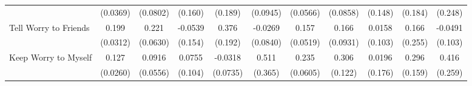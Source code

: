 {\begin{tabular}{l*{10}{c}}
            &    (0.0369)         &    (0.0802)         &     (0.160)         &     (0.189)         &    (0.0945)         &    (0.0566)         &    (0.0858)         &     (0.148)         &     (0.184)         &     (0.248)         \\
\addlinespace
Tell Worry to Friends&       0.199\sym{***}&       0.221\sym{***}&     -0.0539         &       0.376         &     -0.0269         &       0.157\sym{**} &       0.166         &      0.0158         &       0.166         &     -0.0491         \\
            &    (0.0312)         &    (0.0630)         &     (0.154)         &     (0.192)         &    (0.0840)         &    (0.0519)         &    (0.0931)         &     (0.103)         &     (0.255)         &     (0.103)         \\
\addlinespace
Keep Worry to Myself&       0.127\sym{***}&      0.0916         &      0.0755         &     -0.0318         &       0.511         &       0.235\sym{***}&       0.306\sym{*}  &      0.0196         &       0.296         &       0.416         \\
            &    (0.0260)         &    (0.0556)         &     (0.104)         &    (0.0735)         &     (0.365)         &    (0.0605)         &     (0.122)         &     (0.176)         &     (0.159)         &     (0.259)         \\
\bottomrule
\end{tabular}
}
